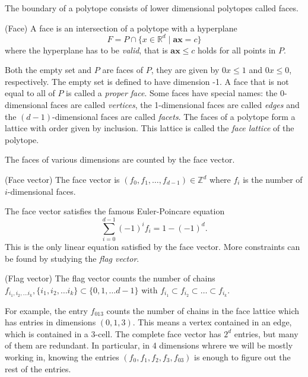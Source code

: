  The boundary 
of a polytope consists of lower dimensional polytopes called faces. 
\begin{definition}
 (Face) A face is an intersection of a polytope with a hyperplane 
\begin{equation}
 F = P \cap \{x \in \mathbb{R}^d \mid \mathbf{a}\mathbf{x} = c\}
\end{equation}
where the hyperplane has to be \textit{valid}, that is $\mathbf{a}\mathbf{x} 
\leq c$ holds for all points in $P$. 

\end{definition}
Both the empty set and $P$ are faces of $P$, they are given by $0x \le 1$ and $0x \le 0$, respectively.
The empty set is defined to have dimension -1.
A face that is not equal to all of $P$ is called a \textit{proper face}.
Some faces have special names: the 0-dimensional faces are called 
\textit{vertices}, the 1-dimensional faces are called \textit{edges} and the 
$(d-1)$-dimensional faces are called \textit{facets}.
 The faces of a polytope 
form a lattice with order given by inclusion. This lattice is called the 
\textit{face lattice} of the polytope.

The faces of various dimensions 
are counted by the face vector.
\begin{definition}
 (Face vector) The face vector is $(f_0, f_1, \dots, f_{d-1}) \in \mathbb{Z}^d$ 
where $f_i$ is 
the number of $i$-dimensional faces.
\end{definition}
The face vector satisfies the famous Euler-Poincare equation
\begin{equation}
 \sum_{i=0}^{d-1} (-1)^i f_i = 1 - (-1)^d.
\end{equation}
This is the only linear equation satisfied by the face vector. More 
constraints can be found by studying the \textit{flag vector}.

\begin{definition}
 (Flag vector) The flag vector counts the number of chains $f_{i_1,i_2,\dots i_k}, \{i_1,i_2,\dots i_k \} \subset \{0,1,\dots d-1\}$
with $f_{i_1} \subset f_{i_2} \subset \dots \subset f_{i_k}$.
\end{definition}

For example, the entry $f_{013}$ counts the number of chains in the face 
lattice which has entries in dimensions $(0,1,3)$. This means a vertex contained in an
edge, which is contained in a 3-cell. The complete face vector has $2^d$ entries,
but many of them are redundant. In particular, in 4 dimensions whrere we will be mostly working in,
knowing the entries $(f_0, f_1, f_2, f_3, f_{03})$ is enough to figure out the rest of the entries. 

